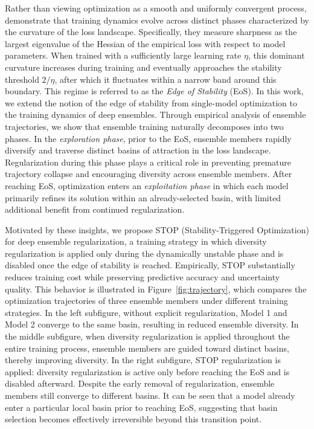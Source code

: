 \documentclass[sigconf]{acmart}
\begin{document}
Rather than viewing optimization as a smooth and uniformly convergent process, \citet{cohen2021gradient} demonstrate that training dynamics evolve across distinct phases characterized by the curvature of the loss landscape.
Specifically, they measure sharpness as the largest eigenvalue of the Hessian of the empirical loss with respect to model parameters.
When trained with a sufficiently large learning rate $\eta$, this dominant curvature increases during training and eventually approaches the stability threshold $2/\eta$,
after which it fluctuates within a narrow band around this boundary.
This regime is referred to as the \emph{Edge of Stability} (EoS).
In this work, we extend the notion of the edge of stability from single-model optimization to the training dynamics of deep ensembles. Through empirical analysis of ensemble trajectories, we show that ensemble training naturally decomposes into two phases. In the \emph{exploration phase}, prior to the EoS, ensemble members rapidly diversify and traverse distinct basins of attraction in the loss landscape. Regularization during this phase plays a critical role in preventing premature trajectory collapse and encouraging diversity across ensemble members. After reaching EoS, optimization enters an \emph{exploitation phase} in which each model primarily refines its solution within an already-selected basin, with limited additional benefit from continued regularization.

Motivated by these insights, we propose STOP (Stability-Triggered Optimization) for deep ensemble regularization, a training strategy in which diversity regularization is applied only during the dynamically unstable phase and is disabled once the edge of stability is reached. Empirically, STOP substantially reduces training cost while preserving predictive accuracy and uncertainty quality. This behavior is illustrated in Figure~\ref{fig:trajectory}, which compares the optimization trajectories of three ensemble members under different training strategies. In the left subfigure, without explicit regularization, Model 1 and Model 2 converge to the same basin, resulting in reduced ensemble diversity. In the middle subfigure, when diversity regularization is applied throughout the entire training process, ensemble members are guided toward distinct basins, thereby improving diversity. In the right subfigure, STOP regularization is applied: diversity regularization is active only before reaching the EoS and is disabled afterward. Despite the early removal of regularization, ensemble members still converge to different basins. It can be seen that a model already enter a particular local basin prior to reaching EoS, suggesting that basin selection becomes effectively irreversible beyond this transition point.
\end{document}
